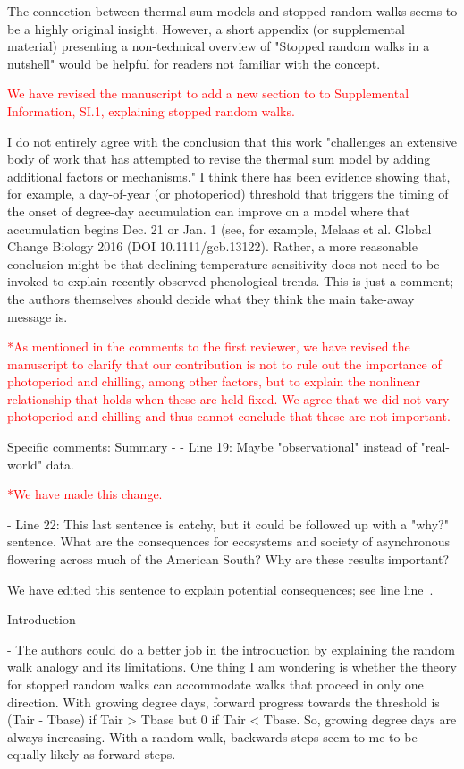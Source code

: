 \documentclass{article}
\newcommand{\lr}[1]{line~\lineref{#1}}
\begin{document}
The connection between thermal sum models and stopped random walks seems to be a highly original insight. However, a short appendix (or supplemental material) presenting a non-technical overview of "Stopped random walks in a nutshell" would be helpful for readers not familiar with the concept.

\textcolor{red}{We have revised the manuscript to add a new section to to Supplemental Information, SI.1, explaining stopped random walks.}

I do not entirely agree with the conclusion that this work "challenges an extensive body of work that has attempted to revise the thermal sum model by adding additional factors or mechanisms." I think there has been evidence showing that, for example, a day-of-year (or photoperiod) threshold that triggers the timing of the onset of degree-day accumulation can improve on a model where that accumulation begins Dec. 21 or Jan. 1 (see, for example, Melaas et al. Global Change Biology 2016 (DOI 10.1111/gcb.13122). Rather, a more reasonable conclusion might be that declining temperature sensitivity does not need to be invoked to explain recently-observed phenological trends. This is just a comment; the authors themselves should decide what they think the main take-away message is.

\textcolor{red}{*As mentioned in the comments to the first reviewer, we have revised the manuscript to clarify that our contribution is not to rule out the importance of photoperiod and chilling, among other factors, but to explain the nonlinear relationship that holds when these are held fixed. We agree that we did not vary photoperiod and chilling and thus cannot conclude that these are not important.}

Specific comments:
Summary -
- Line 19: Maybe "observational" instead of "real-world" data.

\textcolor{red}{*We have made this change.}

- Line 22: This last sentence is catchy, but it could be followed up with a "why?" sentence. What are the consequences for ecosystems and society of asynchronous flowering across much of the American South? Why are these results important?

We have edited this sentence to explain potential consequences; see line \lr{why}. %

Introduction -

- The authors could do a better job in the introduction by explaining the random walk analogy and its limitations. One thing I am wondering is whether the theory for stopped random walks can accommodate walks that proceed in only one direction. With growing degree days, forward progress towards the threshold is (Tair - Tbase) if Tair > Tbase but 0 if Tair < Tbase. So, growing degree days are always increasing. With a random walk, backwards steps seem to me to be equally likely as forward steps.
\end{document}
